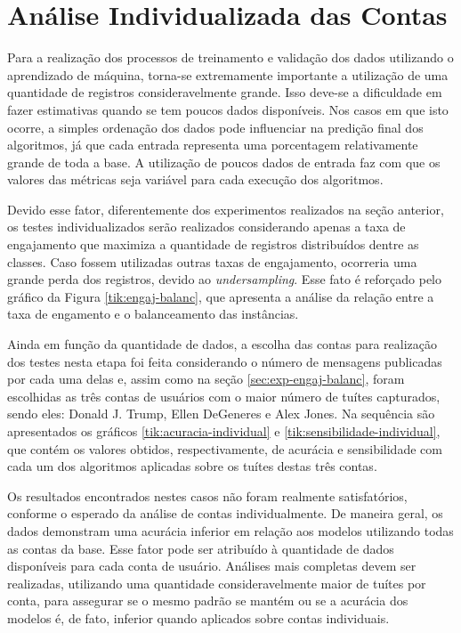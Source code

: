 \documentclass[oneside,openright,12pt]{ufsm_2015} %
\begin{document}

\section{Análise Individualizada das Contas}
\label{sec:exp-analise-individual}

    \par Para a realização dos processos de treinamento e validação dos dados utilizando o aprendizado de máquina, torna-se extremamente importante a utilização de uma quantidade de registros consideravelmente grande. Isso deve-se a dificuldade em fazer estimativas quando se tem poucos dados disponíveis. Nos casos em que isto ocorre, a simples ordenação dos dados pode influenciar na predição final dos algoritmos, já que cada entrada representa uma porcentagem relativamente grande de toda a base. A utilização de poucos dados de entrada faz com que os valores das métricas seja variável para cada execução dos algoritmos.

    \par Devido esse fator, diferentemente dos experimentos realizados na seção anterior, os testes individualizados serão realizados considerando apenas a taxa de engajamento que maximiza a quantidade de registros distribuídos dentre as classes. Caso fossem utilizadas outras taxas de engajamento, ocorreria uma grande perda dos registros, devido ao \textit{undersampling}. Esse fato é reforçado pelo gráfico da Figura \ref{tik:engaj-balanc}, que apresenta a análise da relação entre a taxa de engamento e o balanceamento das instâncias. 
    
    \par Ainda em função da quantidade de dados, a escolha das contas para realização dos testes nesta etapa foi feita considerando o número de mensagens publicadas por cada uma delas e, assim como na seção \ref{sec:exp-engaj-balanc}, foram escolhidas as três contas de usuários com o maior número de tuítes capturados, sendo eles: Donald J. Trump, Ellen DeGeneres e Alex Jones. Na sequência são apresentados os gráficos \ref{tik:acuracia-individual} e \ref{tik:sensibilidade-individual}, que contém os valores obtidos, respectivamente, de acurácia e sensibilidade com cada um dos algoritmos aplicadas sobre os tuítes destas três contas.
    
    \par Os resultados encontrados nestes casos não foram realmente satisfatórios, conforme o esperado da análise de contas individualmente. De maneira geral, os dados demonstram uma acurácia inferior em relação aos modelos utilizando todas as contas da base. Esse fator pode ser atribuído à quantidade de dados disponíveis para cada conta de usuário. Análises mais completas devem ser realizadas, utilizando uma quantidade consideravelmente maior de tuítes por conta, para assegurar se o mesmo padrão se mantém ou se a acurácia dos modelos é, de fato, inferior quando aplicados sobre contas individuais.
    
\end{document}
